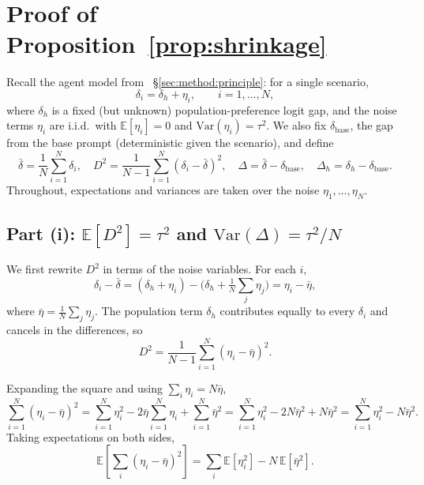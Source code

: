 \documentclass{article}
\begin{document}
\section{Proof of Proposition~\ref{prop:shrinkage}}
\label{app:bias_variance}

Recall the agent model from~ \S\ref{sec:method:principle}: for a single 
scenario,
\begin{equation*}
\delta_i = \delta_h + \eta_i, \qquad i = 1, \ldots, N,
\end{equation*}
where $\delta_h$ is a fixed (but unknown) population-preference 
logit gap, and the noise terms $\eta_i$ are i.i.d.\ with 
$\mathbb{E}[\eta_i] = 0$ and $\mathrm{Var}(\eta_i) = \tau^2$. We 
also fix $\delta_{\text{base}}$, the gap from the base prompt 
(deterministic given the scenario), and define
\begin{equation*}
\bar\delta = \frac{1}{N}\sum_{i=1}^{N} \delta_i, \quad
D^2 = \frac{1}{N-1}\sum_{i=1}^{N}(\delta_i - \bar\delta)^2, \quad
\Delta = \bar\delta - \delta_{\text{base}}, \quad
\Delta_h = \delta_h - \delta_{\text{base}}.
\end{equation*}
Throughout, expectations and variances are taken over the noise 
$\eta_1, \ldots, \eta_N$.

\subsection*{Part (i): $\mathbb{E}[D^2] = \tau^2$ and 
$\mathrm{Var}(\Delta) = \tau^2/N$}

We first rewrite $D^2$ in terms of the noise variables. For each $i$,
\begin{equation*}
\delta_i - \bar\delta 
= (\delta_h + \eta_i) - \Big(\delta_h + \tfrac{1}{N}\sum_j \eta_j\Big)
= \eta_i - \bar\eta,
\end{equation*}
where $\bar\eta = \tfrac{1}{N}\sum_j \eta_j$. The population term 
$\delta_h$ contributes equally to every $\delta_i$ and cancels in 
the differences, so
\begin{equation}
D^2 = \frac{1}{N-1}\sum_{i=1}^{N} (\eta_i - \bar\eta)^2.
\label{eq:D2-noise}
\end{equation}

Expanding the square and using $\sum_i \eta_i = N\bar\eta$,
\begin{equation*}
\sum_{i=1}^{N}(\eta_i - \bar\eta)^2 
= \sum_{i=1}^{N} \eta_i^2 - 2\bar\eta \sum_{i=1}^{N}\eta_i 
+ \sum_{i=1}^{N}\bar\eta^2
= \sum_{i=1}^{N} \eta_i^2 - 2N\bar\eta^2 + N\bar\eta^2 
= \sum_{i=1}^{N} \eta_i^2 - N\bar\eta^2.
\end{equation*}
Taking expectations on both sides,
\begin{equation*}
\mathbb{E}\!\left[\sum_i (\eta_i - \bar\eta)^2\right] 
= \sum_i \mathbb{E}[\eta_i^2] - N\,\mathbb{E}[\bar\eta^2].
\end{equation*}
\end{document}
